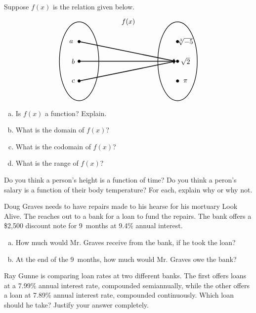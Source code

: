 \documentclass[11pt,letterpaper]{article}
\begin{document}
	
\prob Suppose $f(x)$ is the relation given below.
	\[
	\begin{tikzpicture}
	\node at (2.5,2) {$f(x)$};
	\draw[line width=0.03cm] (0,0) circle (1 and 2);
	\draw[line width=0.03cm] (5,0) circle (1 and 2);
	
	\draw[fill=black] (0,1) circle (0.07);
	\draw[fill=black] (0,0) circle (0.07);
	\draw[fill=black] (0,-1) circle (0.07);
	
	\draw[fill=black] (5,1) circle (0.07);
	\draw[fill=black] (5,0) circle (0.07);
	\draw[fill=black] (5,-1) circle (0.07);
	
	\draw[line width=0.04cm,->] (0,1) -- (4.9,0);
	\draw[line width=0.04cm,->] (0,0) -- (4.9,0);
	\draw[line width=0.04cm,->] (0,-1) -- (4.9,0);
	
	\node at (-0.4,1) {$a$};
	\node at (-0.3,0) {$b$};
	\node at (-0.3,-1) {$c$};
	
	\node at (5.4,1) {$\sqrt[3]{-5}$};
	\node at (5.4,0) {$\sqrt{2}$};
	\node at (5.4,-1) {$\pi$};
	\end{tikzpicture}
	\]

\begin{enumerate}[(a)]
\item Is $f(x)$ a function? Explain.
\item What is the domain of $f(x)$?
\item What is the codomain of $f(x)$?
\item What is the range of $f(x)$?
\end{enumerate} \pspace
	

\prob Do you think a person's height is a function of time? Do you think a peron's salary is a function of their body temperature? For each, explain why or why not. \pspace	
	
	
\prob Doug Graves needs to have repairs made to his hearse for his mortuary Look Alive. The reaches out to a bank for a loan to fund the repairs. The bank offers a \$2,500 discount note for 9~months at 9.4\% annual interest.
	\begin{enumerate}[(a)]
	\item How much would Mr. Graves receive from the bank, if he took the loan?
	\item At the end of the 9~months, how much would Mr. Graves owe the bank?
	\end{enumerate} \pspace


\prob Ray Gunne is comparing loan rates at two different banks. The first offers loans at a 7.99\% annual interest rate, compounded semiannually, while the other offers a loan at 7.89\% annual interest rate, compounded continuously. Which loan should he take? Justify your answer completely. \pspace	
	
\end{document}
